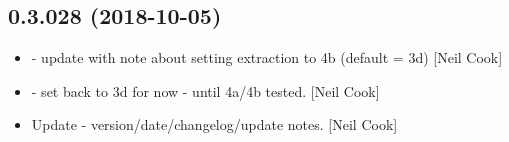 \documentclass[a4paper,10pt,english]{report}
\begin{document}
\subsection{0.3.028 (2018-10-05)}
\label{\detokenize{misc/changelog:id303}}\begin{itemize}
\item {} 
 - update with note about setting extraction to 4b
(default = 3d) {[}Neil Cook{]}

\item {} 
 - set  back to 3d for now -
until 4a/4b tested. {[}Neil Cook{]}

\item {} 
Update - version/date/changelog/update notes. {[}Neil Cook{]}

\end{itemize}
\end{document}
